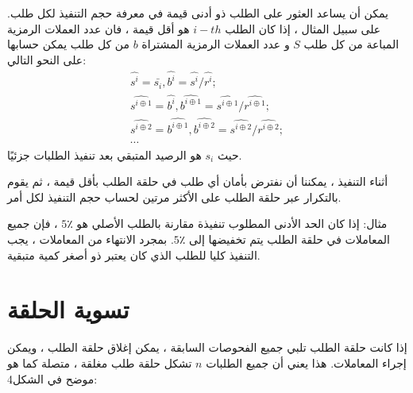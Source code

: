 \documentclass[12pt, a4paper, leqno]{report}
\makeatletter
\newenvironment{figurehere}
 {\def\@captype{figure}}
 {}
\theoremstyle{plain}
\theoremstyle{definition}
\makeatother
\begin{document}
\begin{multicols}{2}
يمكن أن يساعد العثور على الطلب ذو أدنى قيمة في معرفة حجم التنفيذ لكل طلب. على سبيل المثال ، إذا كان الطلب $i-th$  هو أقل قيمة ، فان عدد العملات الرمزية المباعة من كل طلب $S$ و عدد العملات الرمزية المشتراة $b$ من كل طلب يمكن حسابها على النحو التالي:
\begin{gather*} 
\hat{s^i} = \bar{s_i}, \hat{b^i} = \hat{s^i} / \hat{r^i}; \\ 
\hat{s^{i\oplus1}} = \hat{b^i}, \hat{b^{i\oplus1}} = \hat{s^{i\oplus1}} / \hat{r^{i\oplus1}}; \\
\hat{s^{i\oplus2}} = \hat{b^{i\oplus1}}, \hat{b^{i\oplus2}} = \hat{s^{i\oplus2}} / \hat{r^{i\oplus2}}; \\
\cdots
\end{gather*}
حيث $s_i$ هو الرصيد المتبقي بعد تنفيذ الطلبات جزئيًا.

أثناء التنفيذ ، يمكننا أن نفترض بأمان أي طلب في حلقة الطلب بأقل قيمة ، ثم يقوم بالتكرار عبر حلقة الطلب على الأكثر مرتين لحساب حجم التنفيذ لكل أمر.

مثال: إذا كان الحد الأدنى المطلوب تنفيذة مقارنة بالطلب الأصلي هو $5٪$ ، فإن جميع المعاملات في حلقة الطلب يتم تخفيضها إلى $5٪$. بمجرد الانتهاء من المعاملات ، يجب التنفيذ كليا للطلب الذي كان يعتبر ذو أصغر كمية متبقية.
\section{تسوية الحلقة}
\begin{otherlanguage}{arabic}
إذا كانت حلقة الطلب تلبي جميع الفحوصات السابقة ، يمكن إغلاق حلقة الطلب ، ويمكن إجراء المعاملات. هذا يعني أن جميع الطلبات $n$ تشكل حلقة طلب مغلقة ، متصلة كما هو موضح في الشكل4:

\begin{center}
\begin{figurehere}
\centering
{}
\end{figurehere}
\end{center}
\end{otherlanguage}
\end{multicols}
\end{document}
